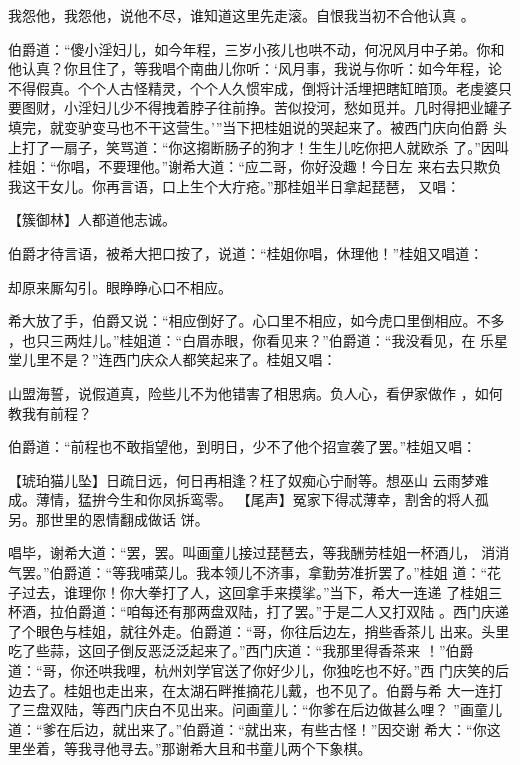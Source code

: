 我怨他，我怨他，说他不尽，谁知道这里先走滚。自恨我当初不合他认真
。

伯爵道：“傻小淫妇儿，如今年程，三岁小孩儿也哄不动，何况风月中子弟。你和
他认真？你且住了，等我唱个南曲儿你听：‘风月事，我说与你听：如今年程，论
不得假真。个个人古怪精灵，个个人久惯牢成，倒将计活埋把瞎缸暗顶。老虔婆只
要图财，小淫妇儿少不得拽着脖子往前挣。苦似投河，愁如觅并。几时得把业罐子
填完，就变驴变马也不干这营生。’”当下把桂姐说的哭起来了。被西门庆向伯爵
头上打了一扇子，笑骂道：“你这搊断肠子的狗才！生生儿吃你把人就欧杀
了。”因叫桂姐：“你唱，不要理他。”谢希大道：“应二哥，你好没趣！今日左
来右去只欺负我这干女儿。你再言语，口上生个大疔疮。”那桂姐半日拿起琵琶，
又唱：

【簇御林】人都道他志诚。

伯爵才待言语，被希大把口按了，说道：“桂姐你唱，休理他！”桂姐又唱道：

却原来厮勾引。眼睁睁心口不相应。

希大放了手，伯爵又说：“相应倒好了。心口里不相应，如今虎口里倒相应。不多
，也只三两炷儿。”桂姐道：“白眉赤眼，你看见来？”伯爵道：“我没看见，在
乐星堂儿里不是？”连西门庆众人都笑起来了。桂姐又唱：

山盟海誓，说假道真，险些儿不为他错害了相思病。负人心，看伊家做作
，如何教我有前程？

伯爵道：“前程也不敢指望他，到明日，少不了他个招宣袭了罢。”桂姐又唱：

【琥珀猫儿坠】日疏日远，何日再相逢？枉了奴痴心宁耐等。想巫山
云雨梦难成。薄情，猛拚今生和你凤拆鸾零。
【尾声】冤家下得忒薄幸，割舍的将人孤另。那世里的恩情翻成做话
饼。

唱毕，谢希大道：“罢，罢。叫画童儿接过琵琶去，等我酬劳桂姐一杯酒儿，
消消气罢。”伯爵道：“等我哺菜儿。我本领儿不济事，拿勤劳准折罢了。”桂姐
道：“花子过去，谁理你！你大拳打了人，这回拿手来摸挲。”当下，希大一连递
了桂姐三杯酒，拉伯爵道：“咱每还有那两盘双陆，打了罢。”于是二人又打双陆
。西门庆递了个眼色与桂姐，就往外走。伯爵道：“哥，你往后边左，捎些香茶儿
出来。头里吃了些蒜，这回子倒反恶泛泛起来了。”西门庆道：“我那里得香茶来
！”伯爵道：“哥，你还哄我哩，杭州刘学官送了你好少儿，你独吃也不好。”西
门庆笑的后边去了。桂姐也走出来，在太湖石畔推摘花儿戴，也不见了。伯爵与希
大一连打了三盘双陆，等西门庆白不见出来。问画童儿：“你爹在后边做甚么哩？
”画童儿道：“爹在后边，就出来了。”伯爵道：“就出来，有些古怪！”因交谢
希大：“你这里坐着，等我寻他寻去。”那谢希大且和书童儿两个下象棋。

